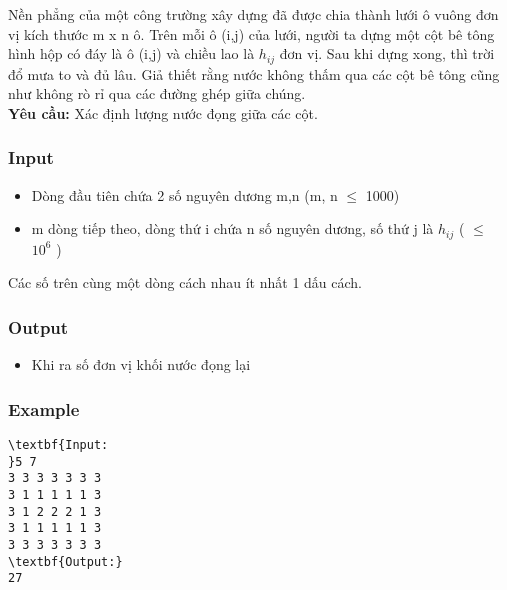 

Nền phẳng của một công trường xây dựng đã được chia thành lưới ô vuông đơn vị kích thước m x n ô. Trên mỗi ô (i,j) của lưới, người ta dựng một cột bê tông hình hộp có đáy là ô (i,j) và chiều lao là $h_{ij}$ đơn vị. Sau khi dựng xong, thì trời đổ mưa to và đủ lâu. Giả thiết rằng nước không thấm qua các cột bê tông cũng như không rò rỉ qua các đường ghép giữa chúng.
\\\textbf{Yêu cầu:} Xác định lượng nước đọng giữa các cột.

\subsubsection{Input}
\begin{itemize}
	\item Dòng đầu tiên chứa 2 số nguyên dương m,n (m, n  $\le$ 1000)
	\item m dòng tiếp theo, dòng thứ i chứa n số nguyên dương, số thứ j là $h_{ij}$ ( $\le$ $10^{6}$ )
\end{itemize}

Các số trên cùng một dòng cách nhau ít nhất 1 dấu cách.

\subsubsection{Output}
\begin{itemize}
	\item Khi ra số đơn vị khối nước đọng lại
\end{itemize}

\subsubsection{Example}
\begin{verbatim}
\textbf{Input:
}5 7
3 3 3 3 3 3 3
3 1 1 1 1 1 3
3 1 2 2 2 1 3
3 1 1 1 1 1 3
3 3 3 3 3 3 3
\textbf{Output:}
27
\end{verbatim}
